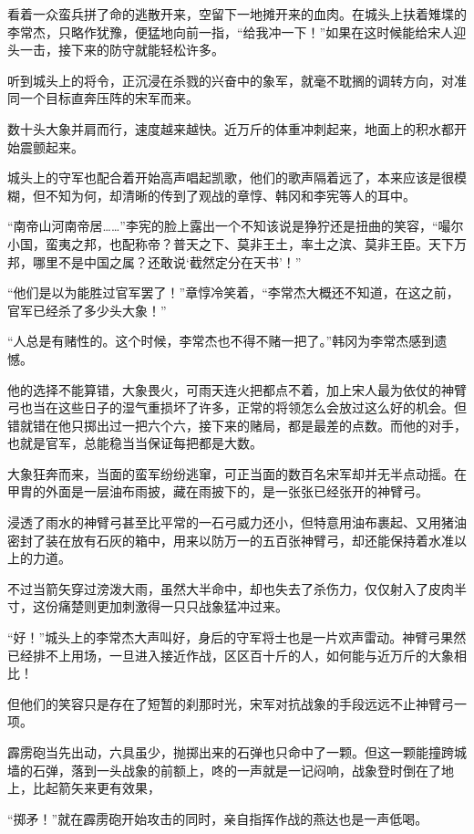 看着一众蛮兵拼了命的逃散开来，空留下一地摊开来的血肉。在城头上扶着雉堞的李常杰，只略作犹豫，便猛地向前一指，“给我冲一下！”如果在这时候能给宋人迎头一击，接下来的防守就能轻松许多。

听到城头上的将令，正沉浸在杀戮的兴奋中的象军，就毫不耽搁的调转方向，对准同一个目标直奔压阵的宋军而来。

数十头大象并肩而行，速度越来越快。近万斤的体重冲刺起来，地面上的积水都开始震颤起来。

城头上的守军也配合着开始高声唱起凯歌，他们的歌声隔着远了，本来应该是很模糊，但不知为何，却清晰的传到了观战的章惇、韩冈和李宪等人的耳中。

“南帝山河南帝居……”李宪的脸上露出一个不知该说是狰狞还是扭曲的笑容，“嘬尔小国，蛮夷之邦，也配称帝？普天之下、莫非王土，率土之滨、莫非王臣。天下万邦，哪里不是中国之属？还敢说‘截然定分在天书’！”

“他们是以为能胜过官军罢了！”章惇冷笑着，“李常杰大概还不知道，在这之前，官军已经杀了多少头大象！”

“人总是有赌性的。这个时候，李常杰也不得不赌一把了。”韩冈为李常杰感到遗憾。

他的选择不能算错，大象畏火，可雨天连火把都点不着，加上宋人最为依仗的神臂弓也当在这些日子的湿气重损坏了许多，正常的将领怎么会放过这么好的机会。但错就错在他只掷出过一把六个六，接下来的赌局，都是最差的点数。而他的对手，也就是官军，总能稳当当保证每把都是大数。

大象狂奔而来，当面的蛮军纷纷逃窜，可正当面的数百名宋军却并无半点动摇。在甲胄的外面是一层油布雨披，藏在雨披下的，是一张张已经张开的神臂弓。

浸透了雨水的神臂弓甚至比平常的一石弓威力还小，但特意用油布裹起、又用猪油密封了装在放有石灰的箱中，用来以防万一的五百张神臂弓，却还能保持着水准以上的力道。

不过当箭矢穿过滂泼大雨，虽然大半命中，却也失去了杀伤力，仅仅射入了皮肉半寸，这份痛楚则更加刺激得一只只战象猛冲过来。

“好！”城头上的李常杰大声叫好，身后的守军将士也是一片欢声雷动。神臂弓果然已经排不上用场，一旦进入接近作战，区区百十斤的人，如何能与近万斤的大象相比！

但他们的笑容只是存在了短暂的刹那时光，宋军对抗战象的手段远远不止神臂弓一项。

霹雳砲当先出动，六具虽少，抛掷出来的石弹也只命中了一颗。但这一颗能撞跨城墙的石弹，落到一头战象的前额上，咚的一声就是一记闷响，战象登时倒在了地上，比起箭矢来更有效果，

“掷矛！”就在霹雳砲开始攻击的同时，亲自指挥作战的燕达也是一声低喝。

